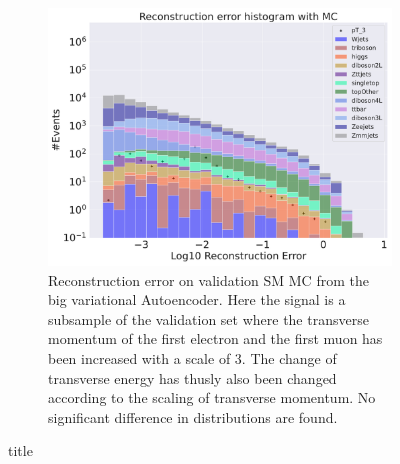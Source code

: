 \begin{figure}[h!]
\begin{subfigure}{.45\textwidth}
        \includegraphics[width=\textwidth]{Figures/AE_testing/big/b_data_recon_big_rm3_feats_sig_pT_3.pdf}
        \caption{Reconstruction error on validation SM MC from the big variational Autoencoder. Here the signal is a subsample of the validation 
        set where the transverse momentum of the first electron and the first muon has been increased with a scale of $3$. The change of transverse 
        energy has thusly also been changed according to the scaling of transverse momentum. No significant difference in distributions are found. }
        \label{fig:ae_big_pt_3}
    \end{subfigure}
    \hfill 
    \caption{title}
    \label{fig:ae_big_small_pt_3}
\end{figure}

